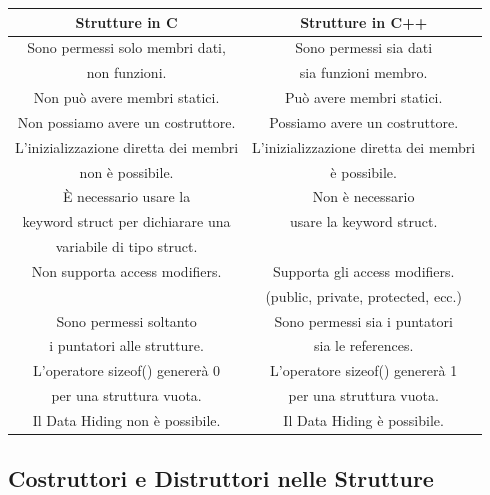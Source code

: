 \begin{tabular}{|c|c|}
	\hline
	\textbf{Strutture in C} & \textbf{Strutture in C++} \\
	\hline
	\textsf{\small Sono permessi solo membri dati, } & \textsf{\small Sono permessi sia dati } \\
	\textsf{\small non funzioni.} & \textsf{\small sia funzioni membro.} \\
	\hline
	\textsf{\small Non può avere membri statici.} & \textsf{\small Può avere membri statici.} \\
	\hline
	\textsf{\small Non possiamo avere un costruttore.} & \textsf{\small Possiamo avere un costruttore.} \\
	\hline
	\textsf{\small L'inizializzazione diretta dei membri } & \textsf{\small L'inizializzazione diretta dei membri } \\
	\textsf{\small non è possibile.} & \textsf{\small è possibile.} \\
	\hline
	\textsf{\small È necessario usare la  } & \textsf{\small Non è necessario } \\
	\textsf{\small keyword struct per dichiarare una } & \textsf{\small usare la keyword struct.} \\
	\textsf{\small variabile di tipo struct.} & \textsf{\small } \\
	\hline
	\textsf{\small Non supporta access modifiers.} & \textsf{\small Supporta gli access modifiers. } \\
	\textsf{\small } & \textsf{\small (public, private, protected, ecc.)} \\
	\hline
	\textsf{\small Sono permessi soltanto } & \textsf{\small Sono permessi sia i puntatori } \\
	\textsf{\small i puntatori alle strutture.} & \textsf{\small sia le references.} \\
	\hline
	\textsf{\small L'operatore sizeof() genererà 0 } & \textsf{\small L'operatore sizeof() genererà 1 } \\
	\textsf{\small per una struttura vuota.} & \textsf{\small per una struttura vuota.} \\
	\hline
	\textsf{\small Il Data Hiding non è possibile.} & \textsf{\small Il Data Hiding è possibile.} \\
	\hline
\end{tabular}

\subsection{Costruttori e Distruttori nelle Strutture}

